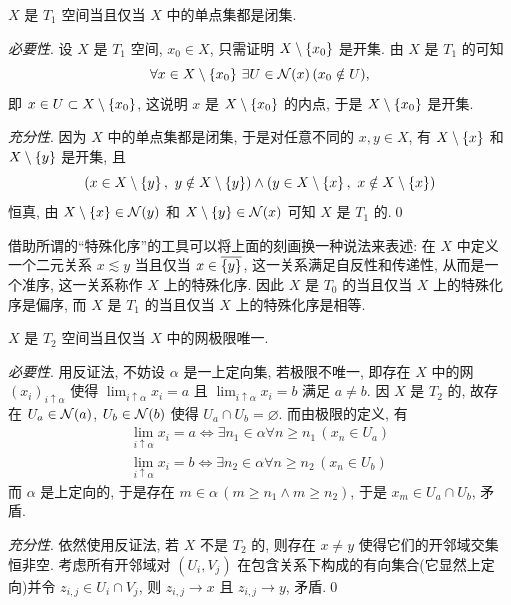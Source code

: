     \begin{Proposition}[$ T_1 $空间的刻画]
        $ X $ 是 $ T_1 $ 空间当且仅当 $ X $ 中的单点集都是闭集.
    \end{Proposition}
    \begin{Proof}
        \textsl{必要性}. 设 $ X $ 是 $ T_1 $ 空间, $ x_0\in X $, 只需证明 $ X\setminus\left\{ x_0 \right\} $ 是开集. 由 $ X $ 是 $ T_1 $ 的可知
        \[
            \forall x\in X\setminus\left\{ x_0 \right\}\,\exists U\in\mathcal{N}(x)\,(x_0\notin U),
        \]
        即 $ x\in U\subset X\setminus\left\{ x_0 \right\} $, 这说明 $ x $ 是 $ X\setminus\left\{ x_0 \right\} $ 的内点, 于是 $ X\setminus\left\{ x_0 \right\} $ 是开集.

        \textsl{充分性}. 因为 $ X $ 中的单点集都是闭集, 于是对任意不同的 $ x,y\in X $, 有 $ X\setminus\left\{ x \right\} $ 和 $ X\setminus\left\{ y \right\} $ 是开集, 且
        \[
            (x\in X\setminus\left\{ y \right\},\ y\notin X\setminus\left\{ y \right\})\land(y\in X\setminus\left\{ x \right\},\ x\notin X\setminus\left\{ x \right\})
        \]
        恒真, 由 $ X\setminus\left\{ x \right\}\in\mathcal{N}(y) $ 和 $ X\setminus\left\{ y \right\}\in\mathcal{N}(x) $ 可知 $ X $ 是 $ T_1 $ 的.\qed
    \end{Proof}

    借助所谓的``特殊化序''的工具可以将上面的刻画换一种说法来表述: 在 $ X $ 中定义一个二元关系 $ x \lesssim y $ 当且仅当 $ x\in\overline{\left\{ y \right\}} $, 这一关系满足自反性和传递性, 从而是一个准序, 这一关系称作 $ X $ 上的特殊化序. 因此 $ X $ 是 $ T_0 $ 的当且仅当 $ X $ 上的特殊化序是偏序, 而 $ X $ 是 $ T_1 $ 的当且仅当 $ X $ 上的特殊化序是相等.

    \begin{Proposition}[$ T_2 $空间的刻画]
        $ X $ 是 $ T_2 $ 空间当且仅当 $ X $ 中的网极限唯一.
    \end{Proposition}
    \begin{Proof}
        \textsl{必要性}. 用反证法, 不妨设 $ \alpha $ 是一上定向集, 若极限不唯一, 即存在 $ X $ 中的网 $ (x_i)_{i\uparrow\alpha} $ 使得 $ \lim_{i\uparrow\alpha}x_i=a $ 且 $ \lim_{i\uparrow\alpha}x_i=b $ 满足 $ a\ne b $. 因 $ X $ 是 $ T_2 $ 的, 故存在 $ U_a\in\mathcal{N}(a) $, $ U_b\in\mathcal{N}(b) $ 使得 $ U_a\cap U_b=\varnothing $. 而由极限的定义, 有
        \[
            \begin{aligned}
                \lim_{i\uparrow\alpha}x_i=a\Longleftrightarrow\exists n_1\in\alpha\forall n\geqslant n_1\,(x_n\in U_a) \\
                \lim_{i\uparrow\alpha}x_i=b\Longleftrightarrow\exists n_2\in\alpha\forall n\geqslant n_2\,(x_n\in U_b)
            \end{aligned}
        \]
        而 $ \alpha $ 是上定向的, 于是存在 $ m\in\alpha\,(m\geqslant n_1\land m\geqslant n_2) $, 于是 $ x_m\in U_a\cap U_b $, 矛盾.
        
        \textsl{充分性}. 依然使用反证法, 若 $ X $ 不是 $ T_2 $ 的, 则存在 $ x\ne y $ 使得它们的开邻域交集恒非空. 考虑所有开邻域对 $ (U_i, V_j) $ 在包含关系下构成的有向集合(它显然上定向)并令 $ z_{i,j}\in U_i\cap V_j $, 则 $ z_{i,j}\to x $ 且 $ z_{i,j}\to y $, 矛盾.\qed
    \end{Proof}

